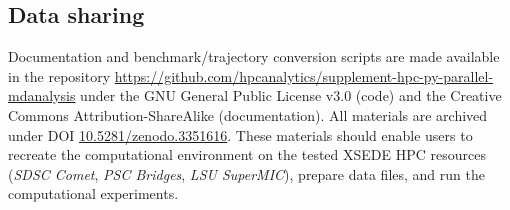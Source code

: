 \subsection{Data sharing}
\label{sec:sharing}

Documentation and benchmark/trajectory conversion scripts are made available in the repository \url{https://github.com/hpcanalytics/supplement-hpc-py-parallel-mdanalysis} under the GNU General Public License v3.0 (code) and the Creative Commons Attribution-ShareAlike (documentation).
All materials are archived under DOI \href{https://doi.org/10.5281/zenodo.3351616}{10.5281/zenodo.3351616}.
These materials should enable users to recreate the computational environment on the tested XSEDE HPC resources (\emph{SDSC Comet}, \emph{PSC Bridges}, \emph{LSU SuperMIC}), prepare data files, and run the computational experiments.

